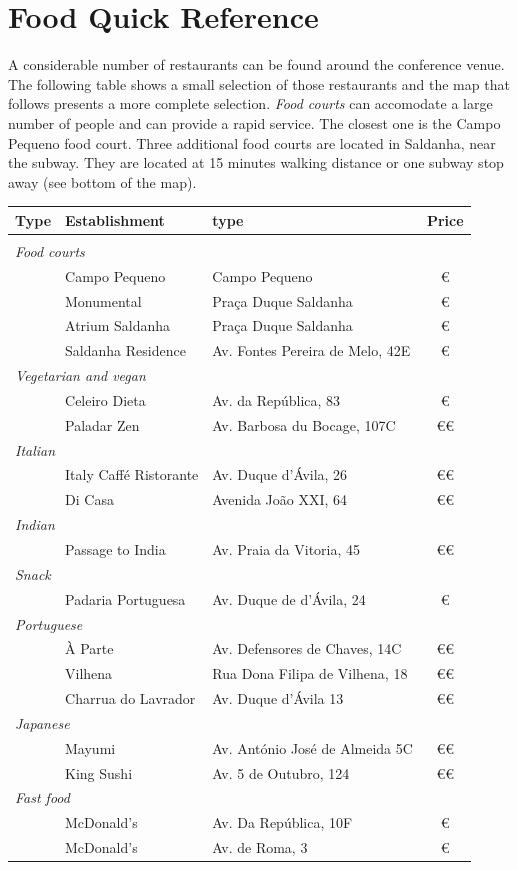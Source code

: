 
\section*{Food Quick Reference}

\thispagestyle{fancy}
{}

A considerable number of restaurants can be found around the conference
venue. The following table shows a small selection of those restaurants
and the map that follows presents a more complete selection. \emph{Food
courts} can accomodate a large number of people and can provide a
rapid service. The closest one is the Campo Pequeno food court. Three
additional food courts are located in Saldanha, near the subway. They
are located at 15 minutes walking distance or one subway stop away
(see bottom of the map). 

\begin{center}
\begin{tabular}{cl>{\raggedright}p{}c}
\textbf{Type} & \textbf{Establishment } & \textbf{type } & \textbf{Price }\tabularnewline
\hline 
 &  &  & \tabularnewline
\multicolumn{4}{l}{\emph{Food courts}}\tabularnewline
 & Campo Pequeno & Campo Pequeno & €\tabularnewline
 & Monumental & Praça Duque Saldanha & €\tabularnewline
 & Atrium Saldanha & Praça Duque Saldanha & €\tabularnewline
 & Saldanha Residence & Av. Fontes Pereira de Melo, 42E & €\tabularnewline
\multicolumn{4}{l}{\emph{Vegetarian and vegan}}\tabularnewline
 & Celeiro Dieta & Av. da República, 83 & €\tabularnewline
 & Paladar Zen & Av. Barbosa du Bocage, 107C & €€\tabularnewline
\multicolumn{4}{l}{\emph{Italian}}\tabularnewline
 & Italy Caffé Ristorante & Av. Duque d'Ávila, 26 & €€\tabularnewline
 & Di Casa & Avenida João XXI, 64 & €€\tabularnewline
\multicolumn{4}{l}{\emph{Indian}}\tabularnewline
 & Passage to India & Av. Praia da Vitoria, 45 & €€\tabularnewline
\multicolumn{4}{l}{\emph{Snack}}\tabularnewline
 & Padaria Portuguesa & Av. Duque de d'Ávila, 24 & €\tabularnewline
\multicolumn{4}{l}{\emph{Portuguese} }\tabularnewline
 & À Parte & Av. Defensores de Chaves, 14C & €€\tabularnewline
 & Vilhena & Rua Dona Filipa de Vilhena, 18 & €€\tabularnewline
 & Charrua do Lavrador & Av. Duque d'Ávila 13 & €€\tabularnewline
\multicolumn{4}{l}{\emph{Japanese}}\tabularnewline
 & Mayumi & Av. António José de Almeida 5C & €€\tabularnewline
 & King Sushi & Av. 5 de Outubro, 124 & €€\tabularnewline
\multicolumn{4}{l}{\emph{Fast food}}\tabularnewline
 & McDonald’s & Av. Da República, 10F & €\tabularnewline
 & McDonald’s & Av. de Roma, 3 & €\tabularnewline
\end{tabular}
\par\end{center}

